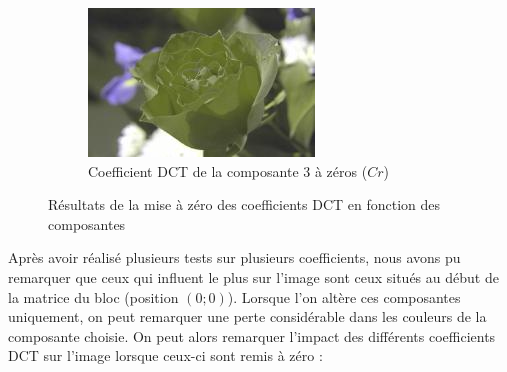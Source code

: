 \begin{figure}[H]
\begin{subfigure}[b]{0.3\textwidth}
        \includegraphics[width=\textwidth]{../SRC/test_b2.jpg}
        \caption{Coefficient DCT de la composante 3 à zéros ($Cr$)}
        \label{img:4}
    \end{subfigure}
    \caption{Résultats de la mise à zéro des coefficients DCT en fonction des composantes}\label{fig:lvl}
\end{figure}
Après avoir réalisé plusieurs tests sur plusieurs coefficients, nous avons pu remarquer que ceux qui influent le plus sur l'image sont ceux situés au début de la matrice du bloc (position $\left(0;0\right)$). Lorsque l'on altère ces composantes uniquement, on peut remarquer une perte considérable dans les couleurs de la composante choisie. On peut alors remarquer l'impact des différents coefficients DCT sur l'image lorsque ceux-ci sont remis à zéro :

